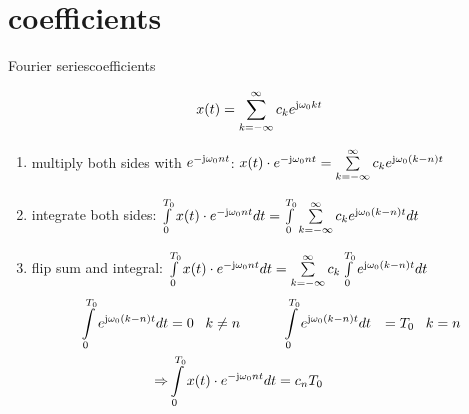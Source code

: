     \section{coefficients}
        \begin{frame}{Fourier series}{coefficients}
            \vspace{-5mm}
            \begin{footnotesize}
            \begin{equation*}\nonumber
               x(t) = \sum\limits_{k=-\infty}^{\infty} c_k e^{\mathrm{j}\omega_0kt}
            \end{equation*}
            \begin{enumerate}
                \item   multiply both sides with $e^{-\mathrm{j}\omega_0nt}$: $x(t)\cdot e^{-\mathrm{j}\omega_0nt} = \sum\limits_{k=-\infty}^{\infty} c_k e^{\mathrm{j}\omega_0(k-n)t}$
                \item   integrate both sides: $\int\limits_0^{T_0}{x(t)\cdot e^{-\mathrm{j}\omega_0nt}}dt = \int\limits_0^{T_0}\sum\limits_{k=-\infty}^{\infty} c_k e^{\mathrm{j}\omega_0(k-n)t}dt$
                \item   flip sum and integral: $ \int\limits_0^{T_0}{x(t)\cdot e^{-\mathrm{j}\omega_0nt}}dt = \sum\limits_{k=-\infty}^{\infty}c_k \int\limits_0^{T_0} e^{\mathrm{j}\omega_0(k-n)t}dt$
                \begin{eqnarray*}
                    \int\limits_0^{T_0} e^{\mathrm{j}\omega_0(k-n)t}dt &= 0 \;\;\;k\neq n\quad\quad\quad
                    \int\limits_0^{T_0} e^{\mathrm{j}\omega_0(k-n)t}dt &= T_0 \;\;\;k= n\nonumber\\
                    \Rightarrow &\int\limits_0^{T_0}{x(t)\cdot e^{-\mathrm{j}\omega_0nt}}dt = c_n T_0&
                \end{eqnarray*}
            \end{enumerate}
            \end{footnotesize}
        \end{frame}


